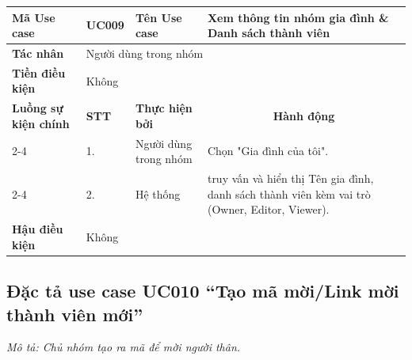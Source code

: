 \documentclass[../main.tex]{subfiles}
\begin{document}
\begingroup
\renewcommand{\arraystretch}{1.5}

\begin{longtable}{|p{2.7cm}|p{0.8cm}|p{2.6cm}|p{7.3cm}|}
\hline
\cellcolor[HTML]{D5F5E3}\textbf{Mã Use case} & \multicolumn{1}{l|}{UC009} & \cellcolor[HTML]{D5F5E3}\textbf{Tên Use case} & Xem thông tin nhóm gia đình \& Danh sách thành viên \\ \hline
\cellcolor[HTML]{D5F5E3}\textbf{Tác nhân} & \multicolumn{3}{p{10.7cm}|}{Người dùng trong nhóm} \\ \hline
\cellcolor[HTML]{D5F5E3}\textbf{Tiền điều kiện} & \multicolumn{3}{p{10.7cm}|}{Không} \\ \hline

\cellcolor[HTML]{D5F5E3}\textbf{Luồng sự kiện chính} & \cellcolor[HTML]{FDEBD0}\textbf{STT} & \cellcolor[HTML]{FDEBD0}\textbf{Thực hiện bởi} & \multicolumn{1}{c|}{\cellcolor[HTML]{FDEBD0}\textbf{Hành động}} \\ \cline{2-4} 
\cellcolor[HTML]{D5F5E3} & 1. & Người dùng trong nhóm & Chọn "Gia đình của tôi". \\ \cline{2-4} 
\cellcolor[HTML]{D5F5E3} & 2. & Hệ thống & truy vấn và hiển thị Tên gia đình, danh sách thành viên kèm vai trò (Owner, Editor, Viewer). \\ \hline

\cellcolor[HTML]{D5F5E3}\textbf{Hậu điều kiện} & \multicolumn{3}{p{10.7cm}|}{Không} \\ \hline
\end{longtable}
\endgroup

\subsection{Đặc tả use case UC010 ``Tạo mã mời/Link mời thành viên mới''}
\textit{Mô tả: Chủ nhóm tạo ra mã để mời người thân.}
\vspace{0.5cm}

\begingroup
\renewcommand{\arraystretch}{1.5}
\end{document}
